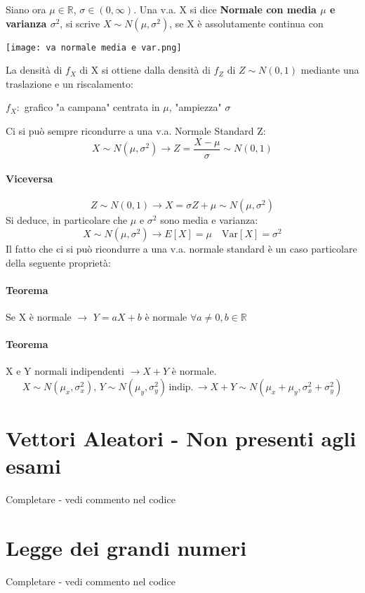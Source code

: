 Siano ora $\mu \in \mathbb{R}$, $\sigma \in (0, \infty)$.
Una v.a. X si dice \textbf{Normale con media $\mu$ e varianza $\sigma^2$}, si scrive
\textbf{$X \sim N(\mu, \sigma^2)$}, se X è assolutamente continua con
\begin{center}
    \texttt{[image: va normale media e var.png]}
\end{center}
La densità di $f_X$ di X si ottiene dalla densità di $f_Z$ di $Z \sim N(0,1)$
mediante una traslazione e un riscalamento:
\begin{center}
    $f_X:$ grafico "a campana" centrata in $\mu$, "ampiezza" $\sigma$
\end{center}
Ci si può sempre ricondurre a una v.a. Normale Standard Z:
\begin{equation*}
    X \sim N(\mu, \sigma^2) \rightarrow Z = \frac{X-\mu}{\sigma} \sim N(0,1)
\end{equation*}
\paragraph*{Viceversa}
\begin{equation*}
    Z \sim N(0,1) \rightarrow X = \sigma Z + \mu \sim N(\mu, \sigma^2)
\end{equation*}
Si deduce, in particolare che $\mu$ e $\sigma^2$ sono media e varianza:
\begin{equation*}
    X \sim N(\mu, \sigma^2) \rightarrow E[X] = \mu \quad \text{Var}[X] = \sigma^2
\end{equation*}
Il fatto che ci si può ricondurre a una v.a. normale standard è un caso particolare
della seguente proprietà:
\paragraph*{Teorema} Se X è normale $\rightarrow$ $Y = aX+b$ è normale 
$\forall a \neq 0, b \in \mathbb{R}$
\paragraph*{Teorema} X e Y normali indipendenti $\rightarrow X+Y$ è normale.
\begin{equation*}
    X \sim N(\mu_x, \sigma^{2}_x), \, Y \sim N(\mu_y, \sigma^{2}_y)\, \text{indip.}\,
    \rightarrow X+Y \sim N(\mu_x+\mu_y, \sigma^{2}_x + \sigma^{2}_y)
\end{equation*}
\section*{Vettori Aleatori - Non presenti agli esami}
Completare - vedi commento nel codice
\section{Legge dei grandi numeri}
Completare - vedi commento nel codice

